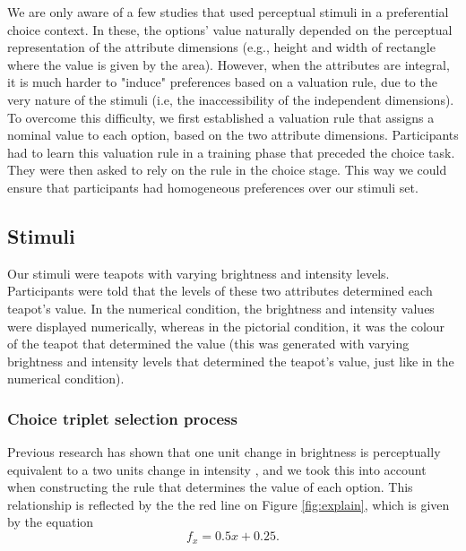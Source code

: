 \documentclass[11pt,a4paper]{article}
\begin{document}
We are only aware of a few studies that used perceptual stimuli in a preferential choice context. In these, the options' value naturally depended on the perceptual representation of the attribute dimensions (e.g., height and width of rectangle where the value is given by the area). However, when the attributes are integral, it is much harder to "induce" preferences based on a valuation rule, due to the very nature of the stimuli (i.e, the inaccessibility of the independent dimensions). To overcome this difficulty, we first established a valuation rule that assigns a nominal value to each option, based on the two attribute dimensions. Participants had to learn this valuation rule in a training phase that preceded the choice task. They were then asked to rely on the rule in the choice stage. This way we could ensure that participants had homogeneous preferences over our stimuli set. 



\subsection{Stimuli}

Our stimuli were teapots with varying brightness and intensity levels. Participants were told that the levels of these two attributes determined each teapot's value. In the numerical condition, the brightness and intensity values were displayed numerically, whereas in the pictorial condition, it was the colour of the teapot that determined the value (this was generated with varying brightness and intensity levels that determined the teapot's value, just like in the numerical condition).  

\subsubsection{Choice triplet selection process}


Previous research has shown that one unit change in brightness is perceptually equivalent to a two units change in intensity \cite{Newhall1940}, and we took this into account when constructing the rule that determines the value of each option. This relationship is reflected by the the red line on Figure \ref{fig:explain}, which is given by the equation
\begin{equation} \label{eq:redline}
 f_{x} = 0.5x + 0.25.
\end{equation}
\end{document}
